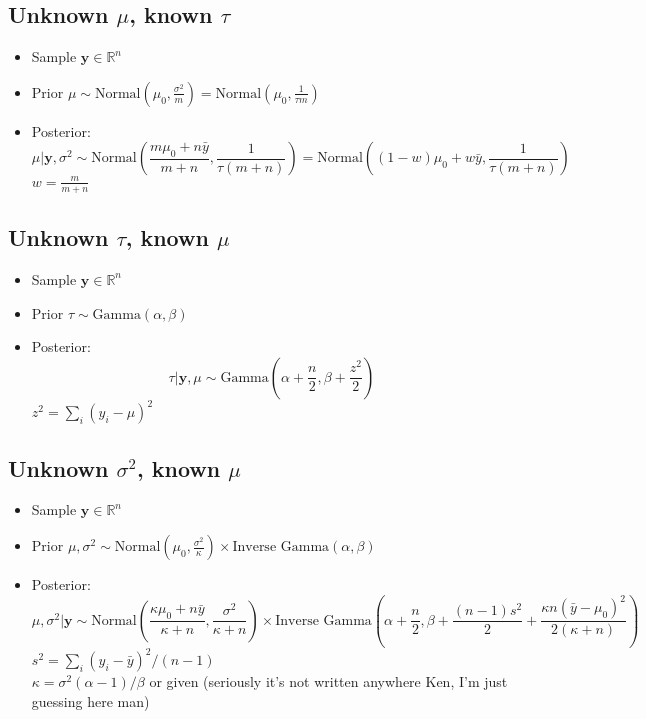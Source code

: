 \documentclass[12pt]{article}
\theoremstyle{definition}
\begin{document}
    \subsection*{Unknown $\mu$, known $\tau$}
    \begin{itemize}
        \item Sample $\bm{y} \in \mathbb{R}^n$
        \item Prior $\mu \sim \text{Normal}\left(\mu_0,\frac{\sigma^2}{m}\right) = \text{Normal}\left(\mu_0,\frac{1}{\tau m}\right)$
        \item Posterior: $$\mu|\bm{y},\sigma^2 \sim \text{Normal}\left( \frac{m\mu_0 + n\bar{y}}{m+n} , \frac{1}{\tau(m+n)} \right) = \text{Normal}\left( (1-w)\mu_0 + w\bar{y} , \frac{1}{\tau(m+n)} \right)$$
            $w = \frac{m}{m+n}$
    \end{itemize}
    \subsection*{Unknown $\tau$, known $\mu$}
    \begin{itemize}
        \item Sample $\bm{y} \in \mathbb{R}^n$
        \item Prior $\tau \sim \text{Gamma}(\alpha,\beta)$
        \item Posterior: $$\tau|\bm{y},\mu \sim \text{Gamma}\left(\alpha + \frac{n}{2}, \beta + \frac{z^2}{2}\right)$$
            $z^2 = \sum_i(y_i - \mu)^2$
    \end{itemize}
    \subsection*{Unknown $\sigma^2$, known $\mu$}
    \begin{itemize}
        \item Sample $\bm{y} \in \mathbb{R}^n$
        \item Prior $\mu,\sigma^2 \sim \text{Normal}\left(\mu_0, \frac{\sigma^2}{\kappa}\right) \times \text{Inverse Gamma}(\alpha, \beta)$
        \item Posterior: $$\mu, \sigma^2|\bm{y} \sim \text{Normal}\left(\frac{\kappa\mu_0 + n\bar{y}}{\kappa + n},\frac{\sigma^2}{\kappa + n}\right) \times \text{Inverse Gamma}\left(\alpha + \frac{n}{2}, \beta + \frac{(n-1)s^2}{2} + \frac{\kappa n(\bar{y} - \mu_0)^2}{2(\kappa + n)}\right)$$
            $s^2 = \sum_i(y_i - \bar{y})^2/(n-1)$\\
            $\kappa = \sigma^2(\alpha-1)/\beta$ or given (seriously it's not written anywhere Ken, I'm just guessing here man)
    \end{itemize}
\end{document}
